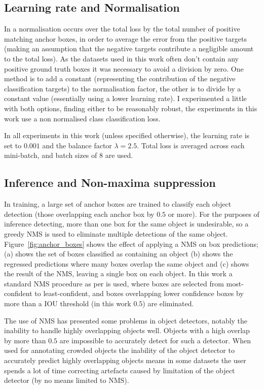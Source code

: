 \subsection {Learning rate and Normalisation}

In \cite{Lin2017} a normalisation occurs over the total loss by the total number of positive matching anchor boxes, in order to average the error from the positive targets (making an assumption that the negative targets contribute a negligible amount to the total loss). As the datasets used in this work often don't contain any positive ground truth boxes it was necessary to avoid a division by zero. One method is to add a constant (representing the contribution of the negative classification targets) to the normalisation factor, the other is to divide by a constant value (essentially using a lower learning rate). I experimented a little with both options, finding either to be reasonably robust, the experiments in this work use a non normalised class classification loss.

In all experiments in this work (unless specified otherwise), the learning rate is set to $0.001$ and the balance factor $\lambda=2.5$. Total loss is averaged across each mini-batch, and batch sizes of $8$ are used.

\subsection{Inference and Non-maxima suppression}

In training, a large set of anchor boxes are trained to classify each object detection (those overlapping each anchor box by $0.5$ or more). For the purposes of inference detecting, more than one box for the same object is undesirable, so a greedy \gls{NMS} is used to eliminate multiple detections of the same object. Figure~\ref{fig:anchor_boxes} shows the effect of applying a \gls{NMS} on box predictions; (a) shows the set of boxes classified as containing an object (b) shows the regressed predictions where many boxes overlap the same object and (c) shows the result of the \gls{NMS}, leaving a single box on each object. In this work a standard \gls{NMS} procedure as per \cite{Wang2017} is used, where boxes are selected from most-confident to least-confident, and  boxes overlapping lower confidence boxes by more than a \gls{IOU} threshold (in this work $0.5$) are eliminated.

The use of \gls{NMS} has presented some problems in object detectors, notably the inability to handle highly overlapping objects well. Objects with a high overlap by more than $0.5$ are impossible to accurately detect for such a detector. When used for annotating crowded objects the inability of the object detector to accurately predict highly overlapping objects means in some datasets the user spends a lot of time correcting artefacts caused by limitation of the object detector (by no means limited to \gls{NMS}).


